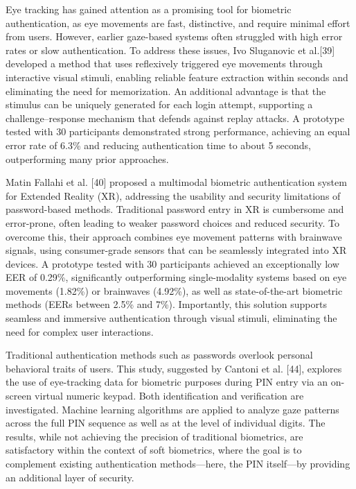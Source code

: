 \documentclass[12pt]{report}
\begin{document}
Eye tracking has gained attention as a promising tool for biometric authentication, as eye movements are fast, distinctive, and require minimal effort from users.
However, earlier gaze-based systems often struggled with high error rates or slow authentication.
To address these issues, Ivo Sluganovic et al.[39] developed a method that uses reflexively triggered eye movements through interactive visual stimuli, enabling reliable feature extraction within seconds and eliminating the need for memorization. 
An additional advantage is that the stimulus can be uniquely generated for each login attempt, supporting a challenge–response mechanism that defends against replay attacks. 
A prototype tested with 30 participants demonstrated strong performance, achieving an equal error rate of 6.3\% and reducing authentication time to about 5 seconds, outperforming many prior approaches.

Matin Fallahi et al. [40] proposed a multimodal biometric authentication system for Extended Reality (XR), addressing the usability and security limitations of password-based methods. 
Traditional password entry in XR is cumbersome and error-prone, often leading to weaker password choices and reduced security. 
To overcome this, their approach combines eye movement patterns with brainwave signals, using consumer-grade sensors that can be seamlessly integrated into XR devices.
A prototype tested with 30 participants achieved an exceptionally low EER of 0.29\%, significantly outperforming single-modality systems based on eye movements (1.82\%) or brainwaves (4.92\%), as well as state-of-the-art biometric methods (EERs between 2.5\% and 7\%).
Importantly, this solution supports seamless and immersive authentication through visual stimuli, eliminating the need for complex user interactions.

Traditional authentication methods such as passwords overlook personal behavioral traits of users.
This study, suggested by Cantoni et al. [44], explores the use of eye-tracking data for biometric purposes during PIN entry via an on-screen virtual numeric keypad.
Both identification and verification are investigated. 
Machine learning algorithms are applied to analyze gaze patterns across the full PIN sequence as well as at the level of individual digits. 
The results, while not achieving the precision of traditional biometrics, are satisfactory within the context of soft biometrics, where the goal is to complement existing authentication methods—here, the PIN itself—by providing an additional layer of security.
\end{document}
